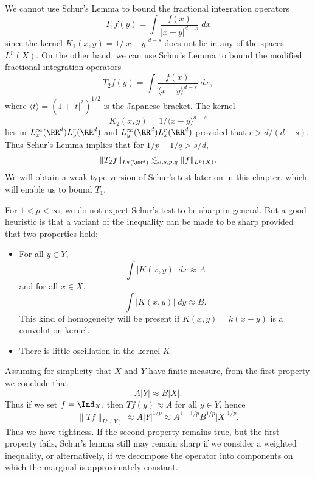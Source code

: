\begin{example}
    We cannot use Schur's Lemma to bound the fractional integration operators
    \[ T_1f(y) = \int \frac{f(x)}{|x - y|^{d-s}}\; dx \]
    since the kernel $K_1(x,y) = 1/|x-y|^{d-s}$ does not lie in any of the spaces $L^p(X)$. On the other hand, we can use Schur's Lemma to bound the modified fractional integration operators
    \[ T_2 f(y) = \int \frac{f(x)}{\langle x - y \rangle^{d-s}}\; dx, \]
    where $\langle t \rangle = (1 + |t|^2)^{1/2}$ is the Japanese bracket. The kernel
    \[ K_2(x,y) = 1/\langle x - y \rangle^{d-s} \]
    lies in $L^\infty_x(\RR^d) L^r_y(\RR^d)$ and $L^\infty_y(\RR^d) L^r_x(\RR^d)$ provided that $r > d/(d-s)$. Thus Schur's Lemma implies that for $1/p - 1/q > s/d$,
    \[ \| T_2 f \|_{L^q(\RR^d)} \lesssim_{d,s,p,q} \| f \|_{L^p(X)}. \]
    We will obtain a weak-type version of Schur's test later on in this chapter, which will enable us to bound $T_1$.
\end{example}

For $1 < p < \infty$, we do not expect Schur's test to be sharp in general. But a good heuristic is that a variant of the inequality can be made to be sharp provided that two properties hold:
%
\begin{itemize}
  \item For all $y \in Y$,
  \[ \int |K(x,y)|\; dx \approx A \]
  and for all $x \in X$,
  \[ \int |K(x,y)|\; dy \approx B. \]
  This kind of homogeneity will be present if $K(x,y) = k(x-y)$ is a convolution kernel.

  \item There is little oscillation in the kernel $K$.
\end{itemize}
%
Assuming for simplicity that $X$ and $Y$ have finite measure, from the first property we conclude that
%
\[ A |Y| \approx B |X|. \]
%
Thus if we set $f = \Ind_X$, then $Tf(y) \approx A$ for all $y \in Y$, hence
%
\[ \| Tf \|_{L^p(Y)} \approx A |Y|^{1/p} \approx A^{1 - 1/p} B^{1/p} |X|^{1/p}. \]
%
Thus we have tightness. If the second property remains true, but the first property fails, Schur's lemma still may remain sharp if we consider a weighted inequality, or alternatively, if we decompose the operator into components on which the marginal is approximately constant.

